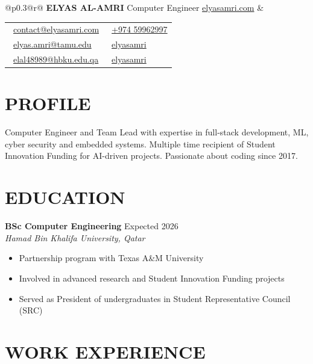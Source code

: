 \documentclass[11pt,a4paper]{article}
\begin{document}
\begin{tabular*}{\textwidth}{@{}p{}@{\extracolsep{\fill}}r@{}}
    \textbf{\Large ELYAS AL-AMRI} \newline
    Computer Engineer \newline
    \href{https://elyasamri.com}{elyasamri.com} &
    \begin{tabular}[t]{@{}l@{\hspace{2em}}l@{}}
        \faEnvelope\ \href{mailto:contact@elyasamri.com}{contact@elyasamri.com} & \faPhone\ \href{tel:+97459962997}{+974 59962997} \\
        \faEnvelope\ \href{mailto:elyas.amri@tamu.edu}{elyas.amri@tamu.edu} & \faGithub\ \href{https://github.com/elyasamri}{elyasamri} \\
        \faEnvelope\ \href{mailto:elal48989@hbku.edu.qa}{elal48989@hbku.edu.qa} & \faLinkedin\ \href{https://linkedin.com/in/elyasamri}{elyasamri}
    \end{tabular}
\end{tabular*}

\section*{PROFILE}
Computer Engineer and Team Lead with expertise in full-stack development, ML, cyber security and embedded systems. Multiple time recipient of Student Innovation Funding for AI-driven projects. Passionate about coding since 2017.

\section*{EDUCATION}

\textbf{BSc Computer Engineering} \hfill Expected 2026 \\
\textit{Hamad Bin Khalifa University, Qatar}
\begin{itemize}[leftmargin=2em, nosep, label={}]
    \item Partnership program with Texas A\&M University
    \item Involved in advanced research and Student Innovation Funding projects
    \item Served as President of undergraduates in Student Representative Council (SRC)
\end{itemize}


\section*{WORK EXPERIENCE}
\end{document}
